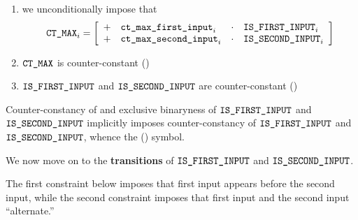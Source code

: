 \begin{enumerate}[resume]
    \item we unconditionally impose that
        \[
            \begin{array}{l}
                \texttt{CT\_MAX} _{i} =
                \left[ \begin{array}{clcl}
                    + & \texttt{ct\_max\_first\_input}_{i} & \cdot & \texttt{IS\_FIRST\_INPUT}_{i} \\
                    + & \texttt{ct\_max\_second\_input}_{i}& \cdot & \texttt{IS\_SECOND\_INPUT}_{i} \\
                \end{array} \right] \\
            \end{array}
        \]
    \item $\texttt{CT\_MAX}$ is counter-constant \quad (\trash)
    \item $\texttt{IS\_FIRST\_INPUT}$ and $\texttt{IS\_SECOND\_INPUT}$ are counter-constant \quad (\trash)
\end{enumerate}
\saNote{} Counter-constancy of \maxCt{} and exclusive binaryness of $\texttt{IS\_FIRST\_INPUT}$ and $\texttt{IS\_SECOND\_INPUT}$ implicitly imposes counter-constancy of $\texttt{IS\_FIRST\_INPUT}$ and $\texttt{IS\_SECOND\_INPUT}$,
whence the (\trash) symbol.


We now move on to the \textbf{transitions} of $\texttt{IS\_FIRST\_INPUT}$ and $\texttt{IS\_SECOND\_INPUT}$.

The first constraint below imposes that first input appears before the second input,
while the second constraint imposes that first input and the second input ``alternate.''

